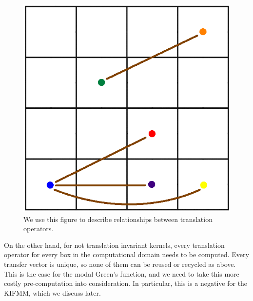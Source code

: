 \documentclass[11pt, oneside]{article}   	%
\begin{document}
\begin{figure}[h]
\caption{We use this figure to describe relationships between translation operators.}
\label{fig:7}
\centering
\includegraphics[scale=0.25]{M2L}
\end{figure}

On the other hand, for not translation invariant kernels, every translation operator for every box in the computational domain needs to be computed. Every transfer vector is unique, so none of them can be reused or recycled as above. This is the case for the modal Green's function, and we need to take this more costly pre-computation into consideration. In particular, this is a negative for the KIFMM, which we discuss later.
\end{document}
